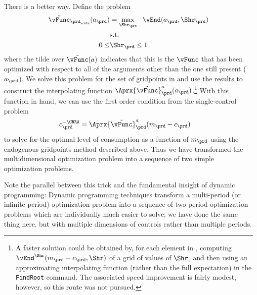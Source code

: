 \documentclass[\econtexRoot/SolvingMicroDSOPs]{subfiles}
\begin{document}
There is a better way.  Define the problem
\providecommand{\Opt}{}
\renewcommand{\Opt}{\tilde}
\providecommand{\vOpt}{}
\renewcommand{\vOpt}{\overset{*}{\vFunc}}
\begin{equation}\begin{gathered}\begin{aligned}
      \Opt{\vFunc}_{{\prd_\cntn}}({a}_{\prd})  & = \max_{\Shr_{\prd}} ~~  \vEnd({a}_{\prd},\Shr_{\prd})
      \\      & \text{s.t.} \nonumber
      \\      0 \leq & \Shr_{\prd} \leq 1
    \end{aligned}\end{gathered}\end{equation}
where the tilde over $\Opt{\vFunc}(a)$ indicates that this is the $\vFunc$ that has been optimized with respect to all of the arguments other than the one still present (${a}_{\prd}$).  We solve this problem for the set of gridpoints in  and use the results to construct the interpolating function $\Aprx{\Opt{\vFunc}}_{\prd}^{a}({a}_{\prd})$.\footnote{A faster solution could be obtained by, for each element in , computing $\vEnd^{\Shr}({m}_{\prd}-{c}_{\prd},\Shr)$ of a grid of values of $\Shr$, and then using an approximating interpolating function (rather than the full expectation) in the \texttt{FindRoot} command.  The associated speed improvement is fairly modest, however, so this route was not pursued.}  With this function in hand, we can use the first order condition from the single-control problem
\begin{equation*}\begin{gathered}\begin{aligned}
      {c}_{\prd}^{-\CRRA}  & = \Aprx{\Opt{\vFunc}}_{\prd}^{{a}}({m}_{\prd}-{c}_{\prd})
    \end{aligned}\end{gathered}\end{equation*}
to solve for the optimal level of consumption as a function of ${m}_{\prd}$ using the endogenous gridpoints method described above.  Thus we have transformed the multidimensional optimization problem into a sequence of two simple optimization problems.

Note the parallel between this trick and the fundamental insight of dynamic programming: Dynamic programming techniques transform a multi-period (or infinite-period) optimization problem into a sequence of two-period optimization problems which are individually much easier to solve; we have done the same thing here, but with multiple dimensions of controls rather than multiple periods.
\end{document}
